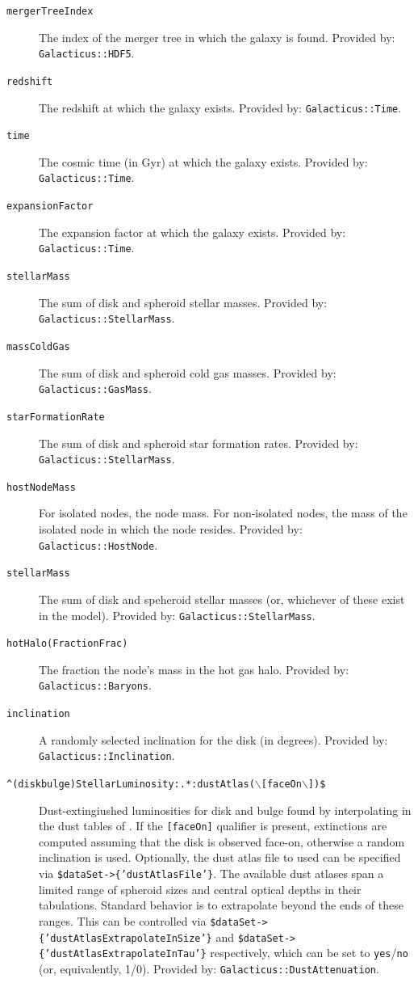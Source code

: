 \begin{description}
 \item[{\tt mergerTreeIndex}] The index of the merger tree in which the galaxy is found. Provided by: {\tt Galacticus::HDF5}.
 \item[{\tt redshift}] The redshift at which the galaxy exists. Provided by: {\tt Galacticus::Time}.
 \item[{\tt time}] The cosmic time (in Gyr) at which the galaxy exists. Provided by: {\tt Galacticus::Time}.
 \item[{\tt expansionFactor}] The expansion factor at which the galaxy exists. Provided by: {\tt Galacticus::Time}.
 \item[{\tt stellarMass}] The sum of disk and spheroid stellar masses. Provided by: {\tt Galacticus::StellarMass}.
 \item[{\tt massColdGas}] The sum of disk and spheroid cold gas masses. Provided by: {\tt Galacticus::GasMass}.
 \item[{\tt starFormationRate}] The sum of disk and spheroid star formation rates. Provided by: {\tt Galacticus::StellarMass}.
 \item[{\tt hostNodeMass}] For isolated nodes, the node mass. For non-isolated nodes, the mass of the isolated node in which the node resides. Provided by: {\tt Galacticus::HostNode}.
 \item[{\tt stellarMass}] The sum of disk and speheroid stellar masses (or, whichever of these exist in the model). Provided by: {\tt Galacticus::StellarMass}.
 \item[{\tt hotHalo(Fraction\textbar Frac)}] The fraction the node's mass in the hot gas halo. Provided by: {\tt Galacticus::Baryons}.
 \item[{\tt inclination}] A randomly selected inclination for the disk (in degrees). Provided by: {\tt Galacticus::Inclination}.
 \item[{\tt \textasciicircum(disk\textbar bulge)StellarLuminosity:.*:dustAtlas($\backslash$[faceOn$\backslash$])\$}] Dust-extingiushed luminosities for disk and bulge found by interpolating in the dust tables of \cite{ferrara_atlas_1999}. If the {\tt [faceOn]} qualifier is present, extinctions are computed assuming that the disk is observed face-on, otherwise a random inclination is used. Optionally, the dust atlas file to used can be specified via {\tt \$dataSet-\textgreater\{'dustAtlasFile'\}}. The available dust atlases span a limited range of spheroid sizes and central optical depths in their tabulations. Standard behavior is to extrapolate beyond the ends of these ranges. This can be controlled via {\tt \$dataSet-\textgreater\{'dustAtlasExtrapolateInSize'\}} and {\tt \$dataSet-\textgreater\{'dustAtlasExtrapolateInTau'\}} respectively, which can be set to {\tt yes}/{\tt no} (or, equivalently, 1/0). Provided by: {\tt Galacticus::DustAttenuation}.

\end{description}
